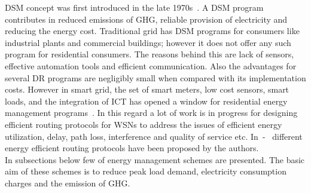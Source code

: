 \documentclass[journal]{IEEEtran}
\begin{document}
\indent DSM concept was first introduced in the late 1970s~\cite{costanzo2012system}. A DSM program contributes in reduced emissions of GHG, reliable provision of electricity and reducing the energy cost. Traditional grid has DSM programs for consumers like industrial plants and commercial buildings; however it does not offer any such program for residential consumers. The reasons behind this are  lack of sensors, effective automation tools and efficient communication. Also the advantages for several DR programs are negligibly small when compared with its implementation costs. However in smart grid, the set of smart meters, low cost sensors, smart loads, and the integration of ICT has opened a window for residential energy management programs~\cite{erol2011wireless}. In this regard a lot of work is in progress for designing efficient routing protocols for WSNs to address the issues of efficient energy utilization, delay, path loss, interference and quality of service etc. In~\cite{ahmad2013density}-~\cite{aslam2012ceec} different energy efficient routing protocols have been proposed by the authors.\\
\indent In subsections below few of energy management schemes are presented. The basic aim of these schemes is to reduce peak load demand, electricity consumption charges and the emission of GHG.
\end{document}
